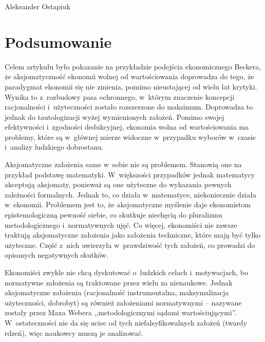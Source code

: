 \begin{artplenv}{Aleksander Ostapiuk}
\section*{Podsumowanie}
Celem artykułu było pokazanie na przykładzie podejścia ekonomicznego Beckera, że aksjomatyczność ekonomii wolnej od
wartościowania doprowadza do tego, że paradygmat ekonomii się nie zmienia, pomimo nieustającej od wielu lat krytyki.
Wynika to z~rozbudowy pasa ochronnego, w~którym znaczenie koncepcji racjonalności i~użyteczności zostało rozszerzone do
maksimum. Doprowadza to jednak do tautologizacji wyżej wymienionych założeń. Pomimo swojej efektywności i~zgodności dedukcyjnej,
ekonomia wolna od wartościowania ma problemy, które są w~głównej mierze widoczne w~przypadku wyborów w~czasie i~analizy
ludzkiego dobrostanu.

Aksjomatyczne założenia same w~sobie nie są problemem. Stanowią one na przykład podstawę matematyki. W~większości
przypadków jednak matematycy akceptują aksjomaty, ponieważ są one użyteczne do wykazania pewnych zależności formalnych.
Jednak to, co działa w~matematyce, niekoniecznie działa w~ekonomii. Problemem jest to, że aksjomatyczne myślenie daje
ekonomistom epistemologiczną pewność siebie, co skutkuje niechęcią do pluralizmu metodologicznego i~normatywnych ujęć.
Co więcej, ekonomiści nie zawsze traktują aksjomatyczne założenia jako założenia techniczne, które mają być tylko
użyteczne. Część z~nich uwierzyła w~prawdziwość tych założeń, co prowadzi do opisanych negatywnych skutków.

Ekonomiści zwykle nie chcą dyskutować o~ludzkich celach i~motywacjach, bo normatywne założenia są traktowane przez wielu
za nienaukowe. Jednak aksjomatyczne założenia (racjonalność instrumentalna, maksymalizacja użyteczności, dobrobyt) są
również założeniami normatywnymi -- nazywane zostały przez Maxa Webera
\parencite*{weber_methodology_1949}
,,metodologicznymi
sądami wartościującymi''. W~ostateczności nie da się uciec od tych niefalsyfikowalnych założeń (twardy rdzeń), więc
naukowcy muszą je analizować.


\end{artplenv}
